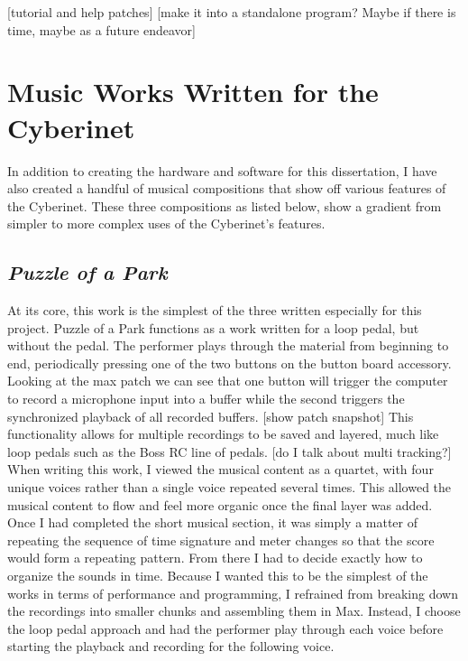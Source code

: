 [tutorial and help patches]
[make it into a standalone program? Maybe if there is time, maybe as a future endeavor]

\chapter{Music Works Written for the Cyberinet}

In addition to creating the hardware and software for this dissertation, I have also created a handful of musical compositions that show off various features of the Cyberinet. These three compositions as listed below, show a gradient from simpler to more complex uses of the Cyberinet’s features.

\section{\textit{Puzzle of a Park}}
At its core, this work is the simplest of the three written especially for this project. Puzzle of a Park functions as a work written for a loop pedal, but without the pedal. The performer plays through the material from beginning to end, periodically pressing one of the two buttons on the button board accessory. Looking at the max patch we can see that one button will trigger the computer to record a microphone input into a buffer while the second triggers the synchronized playback of all recorded buffers. 
[show patch snapshot]
This functionality allows for multiple recordings to be saved and layered, much like loop pedals such as the Boss RC line of pedals. [do I talk about multi tracking?]
When writing this work, I viewed the musical content as a quartet, with four unique voices rather than a single voice repeated several times. This allowed the musical content to flow and feel more organic once the final layer was added. 
Once I had completed the short musical section, it was simply a matter of repeating the sequence of time signature and meter changes so that the score would form a repeating pattern. From there I had to decide exactly how to organize the sounds in time. Because I wanted this to be the simplest of the works in terms of performance and programming, I refrained from breaking down the recordings into smaller chunks and assembling them in Max. Instead, I choose the loop pedal approach and had the performer play through each voice before starting the playback and recording for the following voice. 
